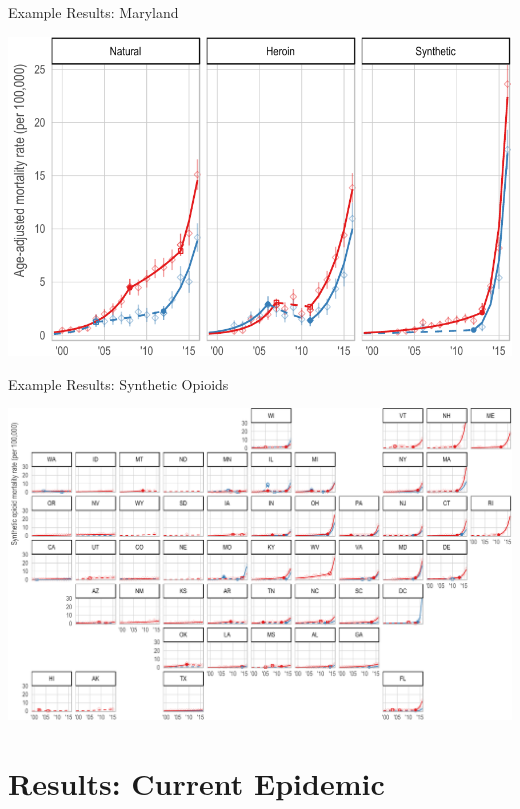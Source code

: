 \documentclass[ignorenonframetext,compress]{beamer}
\begin{document}
\begin{frame}{Example Results: Maryland}

\includegraphics{epc_slides_files/figure-beamer/unnamed-chunk-6-1.pdf}

\end{frame}

\begin{frame}{Example Results: Synthetic Opioids}

\includegraphics{epc_slides_files/figure-beamer/unnamed-chunk-7-1.pdf}

\end{frame}

\section{Results: Current Epidemic}\label{results-current-epidemic}
\end{document}
